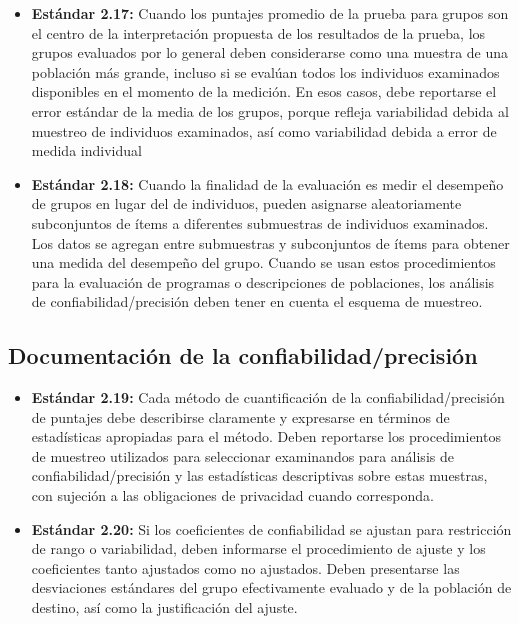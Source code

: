 \documentclass[
  letterpaper,
  DIV=11,
  numbers=noendperiod]{scrreprt}
\providecommand{\tightlist}{%
  \setlength{\itemsep}{0pt}\setlength{\parskip}{0pt}}
\begin{document}
\begin{itemize}
\tightlist
\item
  \textbf{Estándar 2.17:} Cuando los puntajes promedio de la prueba para
  grupos son el centro de la interpretación propuesta de los resultados
  de la prueba, los grupos evaluados por lo general deben considerarse
  como una muestra de una población más grande, incluso si se evalúan
  todos los individuos examinados disponibles en el momento de la
  medición. En esos casos, debe reportarse el error estándar de la media
  de los grupos, porque refleja variabilidad debida al muestreo de
  individuos examinados, así como variabilidad debida a error de medida
  individual
\item
  \textbf{Estándar 2.18:} Cuando la finalidad de la evaluación es medir
  el desempeño de grupos en lugar del de individuos, pueden asignarse
  aleatoriamente subconjuntos de ítems a diferentes submuestras de
  individuos examinados. Los datos se agregan entre submuestras y
  subconjuntos de ítems para obtener una medida del desempeño del grupo.
  Cuando se usan estos procedimientos para la evaluación de programas o
  descripciones de poblaciones, los análisis de confiabilidad/precisión
  deben tener en cuenta el esquema de muestreo.
\end{itemize}

\subsection{Documentación de la
confiabilidad/precisión}\label{documentaciuxf3n-de-la-confiabilidadprecisiuxf3n}

\begin{itemize}
\tightlist
\item
  \textbf{Estándar 2.19:} Cada método de cuantificación de la
  confiabilidad/precisión de puntajes debe describirse claramente y
  expresarse en términos de estadísticas apropiadas para el método.
  Deben reportarse los procedimientos de muestreo utilizados para
  seleccionar examinandos para análisis de confiabilidad/precisión y las
  estadísticas descriptivas sobre estas muestras, con sujeción a las
  obligaciones de privacidad cuando corresponda.
\item
  \textbf{Estándar 2.20:} Si los coeficientes de confiabilidad se
  ajustan para restricción de rango o variabilidad, deben informarse el
  procedimiento de ajuste y los coeficientes tanto ajustados como no
  ajustados. Deben presentarse las desviaciones estándares del grupo
  efectivamente evaluado y de la población de destino, así como la
  justificación del ajuste.
\end{itemize}
\end{document}
